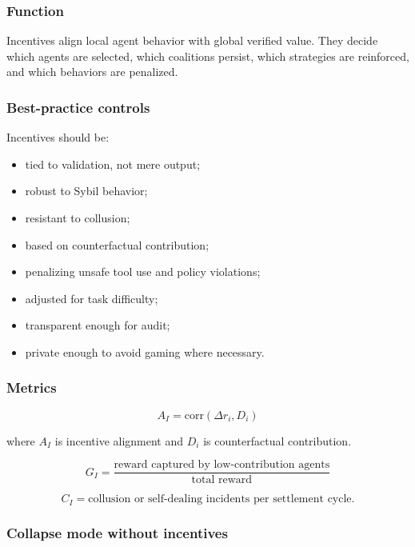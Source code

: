 \documentclass[
  11pt,
]{article}
\providecommand{\tightlist}{%
  \setlength{\itemsep}{0pt}\setlength{\parskip}{0pt}}
\begin{document}
\subsubsection{Function}\label{function-3}

Incentives align local agent behavior with global verified value. They
decide which agents are selected, which coalitions persist, which
strategies are reinforced, and which behaviors are penalized.

\subsubsection{Best-practice controls}\label{best-practice-controls-3}

Incentives should be:

\begin{itemize}
\tightlist
\item
  tied to validation, not mere output;
\item
  robust to Sybil behavior;
\item
  resistant to collusion;
\item
  based on counterfactual contribution;
\item
  penalizing unsafe tool use and policy violations;
\item
  adjusted for task difficulty;
\item
  transparent enough for audit;
\item
  private enough to avoid gaming where necessary.
\end{itemize}

\subsubsection{Metrics}\label{metrics-3}

\[
A_I=\text{corr}(\Delta r_i,D_i)
\]

where \(A_I\) is incentive alignment and \(D_i\) is counterfactual
contribution.

\[
G_I=\frac{\text{reward captured by low-contribution agents}}{\text{total reward}}
\]

\[
C_I=\text{collusion or self-dealing incidents per settlement cycle}.
\]

\subsubsection{Collapse mode without
incentives}\label{collapse-mode-without-incentives}
\end{document}
